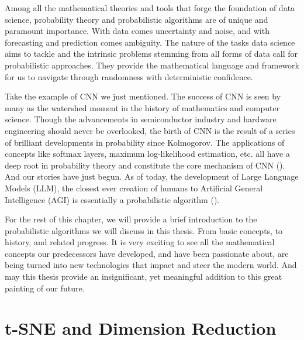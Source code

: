 Among all the mathematical theories and tools that forge the foundation of data
science, probability theory and probabilistic algorithms are of unique and
paramount importance. With data comes uncertainty and noise, and with
forecasting and prediction comes ambiguity. The nature of the tasks data
science aims to tackle and the intrinsic problems stemming from all forms of
data call for probabilistic approaches. They provide the mathematical language
and framework for us to navigate through randomness with deterministic
confidence.

Take the example of CNN we just mentioned. The success of CNN is seen by many
as the watershed moment in the history of mathematics and computer science.
Though the advancements in semiconductor industry and hardware engineering
should never be overlooked, the birth of CNN is the result of a series of
brilliant developments in probability since Kolmogorov. The applications of
concepts like softmax layers, maximum log-likelihood estimation, etc. all have a
deep root in probability theory and constitute the core mechanism of
CNN (\cite{NIPS2012_c399862d}). And our stories have just begun. As of today,
the development of Large Language Models (LLM), the closest ever creation of
humans to Artificial General Intelligence (AGI) is essentially a probabilistic
algorithm (\cite{NIPS2017_3f5ee243}).

For the rest of this chapter, we will provide a brief introduction to the
probabilistic algorithms we will discuss in this thesis. From basic concepts,
to history, and related progress. It is very exciting to see all the
mathematical concepts our predecessors have developed, and have been passionate
about, are being turned into new technologies that impact and steer the modern
world. And may this thesis provide an insignificant, yet meaningful addition
to this great painting of our future.

\section{t-SNE and Dimension Reduction} \label{intro_chap:sec:tsne}
